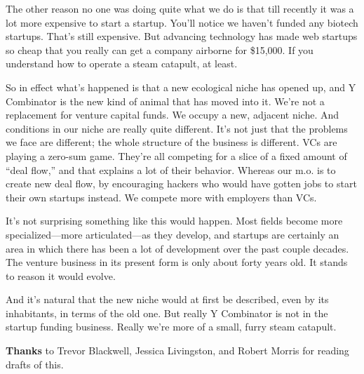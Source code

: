 The other reason no one was doing quite what we do is that till recently
it was a lot more expensive to start a startup. You'll notice we haven't
funded any biotech startups. That's still expensive. But advancing
technology has made web startups so cheap that you really can get a
company airborne for \$15,000. If you understand how to operate a steam
catapult, at least.

So in effect what's happened is that a new ecological niche has opened
up, and Y Combinator is the new kind of animal that has moved into it.
We're not a replacement for venture capital funds. We occupy a new,
adjacent niche. And conditions in our niche are really quite different.
It's not just that the problems we face are different; the whole
structure of the business is different. VCs are playing a zero-sum game.
They're all competing for a slice of a fixed amount of ``deal flow,''
and that explains a lot of their behavior. Whereas our m.o. is to create
new deal flow, by encouraging hackers who would have gotten jobs to
start their own startups instead. We compete more with employers than
VCs.

It's not surprising something like this would happen. Most fields become
more specialized---more articulated---as they develop, and startups are
certainly an area in which there has been a lot of development over the
past couple decades. The venture business in its present form is only
about forty years old. It stands to reason it would evolve.

And it's natural that the new niche would at first be described, even by
its inhabitants, in terms of the old one. But really Y Combinator is not
in the startup funding business. Really we're more of a small, furry
steam catapult.

\textbf{Thanks} to Trevor Blackwell, Jessica Livingston, and Robert
Morris for reading drafts of this.
